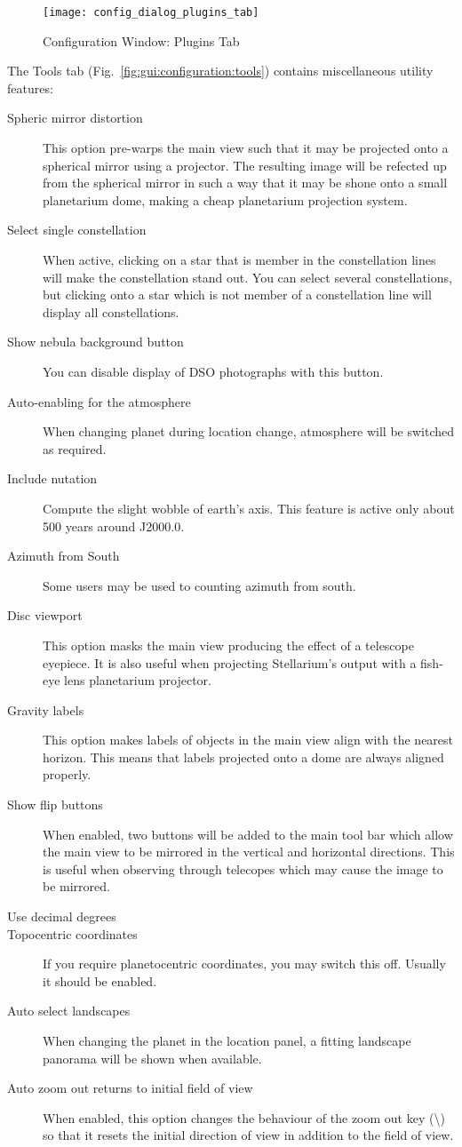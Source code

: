 \begin{figure}[p]
\centering\texttt{[image: config\_dialog\_plugins\_tab]}
\caption{Configuration Window: Plugins Tab}
\label{fig:gui:plugins}
\end{figure}


The Tools tab (Fig.~\ref{fig:gui:configuration:tools}) contains miscellaneous utility
features:

\begin{description}
\item[Spheric mirror distortion] This option pre-warps the main view
  such that it may be projected onto a spherical mirror using a
  projector. The resulting image will be refected up from the spherical
  mirror in such a way that it may be shone onto a small planetarium
  dome, making a cheap planetarium projection system.
\item[Select single constellation] When active, clicking on a star
  that is member in the constellation lines will make the
  constellation stand out. You can select several constellations, but
  clicking onto a star which is not member of a constellation line
  will display all constellations.
\item[Show nebula background button] You can disable display of DSO
  photographs with this button.
\item[Auto-enabling for the atmosphere] When changing planet during
  location change, atmosphere will be switched as required.
\item[Include nutation] Compute the slight wobble of earth's
  axis. This feature is active only about 500 years around J2000.0.
\item[Azimuth from South] Some users may be used to counting azimuth
  from south.
\item[Disc viewport] This option masks the main view
  producing the effect of a telescope eyepiece. It is also useful when
  projecting Stellarium's output with a fish-eye lens planetarium
  projector.
\item[Gravity labels] This option makes labels of objects in the
  main view align with the nearest horizon. This means that labels
  projected onto a dome are always aligned properly.
\item[Show flip buttons] When enabled, two buttons will be added to
  the main tool bar which allow the main view to be mirrored in the
  vertical and horizontal directions. This is useful when observing
  through telecopes which may cause the image to be mirrored.
\item[Use decimal degrees]
\item[Topocentric coordinates] If you require planetocentric
  coordinates, you may switch this off. Usually it should be enabled.
\item[Auto select landscapes] When changing the planet in the location
  panel, a fitting landscape panorama will be shown when available.
\item[Auto zoom out returns to initial field of view] When enabled,
  this option changes the behaviour of the zoom out key
  (\textbackslash{}) so that it resets the initial direction of view in
  addition to the field of view.
\end{description}

